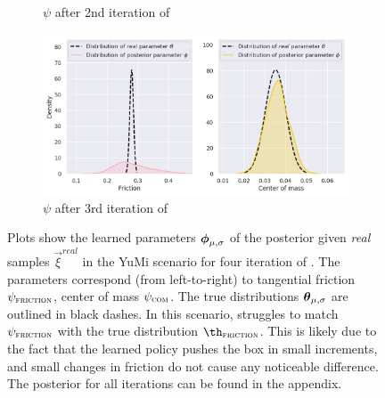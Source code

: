 \begin{figure}
\begin{subfigure}{0.45\textwidth}
  \caption{$\psi$ after 2nd iteration of \dettostoc{}}
\end{subfigure}
\begin{subfigure}{0.45\textwidth}
  \centering
  \includegraphics[width=\linewidth]{img/yumi/latent-representation/yumi_latent_encoding_3_iter}
  \caption{$\psi$ after 3rd iteration of \dettostoc{}}
\end{subfigure}
\caption{Plots show the learned parameters $\boldsymbol{\phi}_{\mu, \sigma}$ of the posterior given \emph{real} samples $\vec{\xi}^{real}$ in the YuMi scenario for four iteration of \dettostoc{}.
The parameters correspond (from left-to-right) to tangential friction $\psi_{\textsc{friction}}$, center of mass $\psi_{\textsc{com}}$. The true distributions $\boldsymbol{\theta}_{\mu, \sigma}$ are outlined in black dashes. In this scenario, \dettostoc{} struggles to match $\psi_{\textsc{friction}}{}$ with the true distribution $\th_\textsc{friction}$. This is likely due to the fact that the learned policy pushes the box in small increments, and small changes in friction do not cause any noticeable difference. The posterior for all iterations can be found in the appendix.}
\label{fig:yumi_latent_space_full}
\end{figure}

